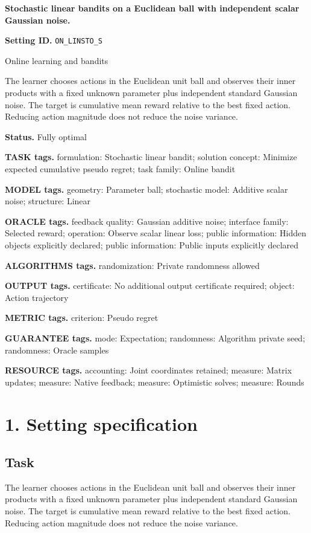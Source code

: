 \documentclass[10pt,a4paper]{article}
\begin{document}
\raggedright

{\LARGE\bfseries\sffamily\color{AtlasNavy} Stochastic linear bandits on a Euclidean ball with independent scalar Gaussian noise.\par}\vspace{5pt}
\textbf{Setting ID.} \texttt{ON\_\allowbreak{}LINSTO\_\allowbreak{}S}

Online learning and bandits

The learner chooses actions in the Euclidean unit ball and observes their inner products with a fixed unknown parameter plus independent standard Gaussian noise. The target is cumulative mean reward relative to the best fixed action. Reducing action magnitude does not reduce the noise variance.

\textbf{Status.} Fully optimal

\textbf{TASK tags.} formulation: Stochastic linear bandit; solution concept: Minimize expected cumulative pseudo regret; task family: Online bandit

\textbf{MODEL tags.} geometry: Parameter ball; stochastic model: Additive scalar noise; structure: Linear

\textbf{ORACLE tags.} feedback quality: Gaussian additive noise; interface family: Selected reward; operation: Observe scalar linear loss; public information: Hidden objects explicitly declared; public information: Public inputs explicitly declared

\textbf{ALGORITHMS tags.} randomization: Private randomness allowed

\textbf{OUTPUT tags.} certificate: No additional output certificate required; object: Action trajectory

\textbf{METRIC tags.} criterion: Pseudo regret

\textbf{GUARANTEE tags.} mode: Expectation; randomness: Algorithm private seed; randomness: Oracle samples

\textbf{RESOURCE tags.} accounting: Joint coordinates retained; measure: Matrix updates; measure: Native feedback; measure: Optimistic solves; measure: Rounds

\section{1. Setting specification}
\subsection{Task}
The learner chooses actions in the Euclidean unit ball and observes their inner products with a fixed unknown parameter plus independent standard Gaussian noise. The target is cumulative mean reward relative to the best fixed action. Reducing action magnitude does not reduce the noise variance.
\end{document}
